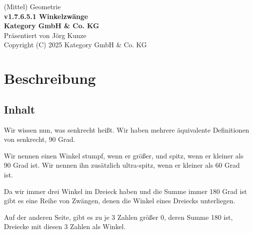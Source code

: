 \documentclass[a4paper]{amsart}
\theoremstyle{definition}
\begin{document}
\begin{titlepage}
\centering
{\huge
(Mittel) Geometrie\\[1cm]
\textbf{v1.7.6.5.1 Winkelzwänge}
}\\[1cm]

\textbf{Kategory GmbH \& Co. KG}\\
Präsentiert von Jörg Kunze\\
Copyright (C) 2025 Kategory GmbH \& Co. KG

\end{titlepage}

%

\newpage

\section*{Beschreibung}

\subsection*{Inhalt}
Wir wissen nun, was senkrecht heißt. Wir haben mehrere äquivalente Definitionen von senkrecht, 90 Grad.

Wir nennen einen Winkel stumpf, wenn er größer, und spitz, wenn er kleiner als 90 Grad ist. Wir nennen ihn zusätzlich ultra-spitz, wenn er kleiner als 60 Grad ist.

Da wir immer drei Winkel im Dreieck haben und die Summe immer 180 Grad ist gibt es eine Reihe von Zwängen, denen die Winkel eines Dreiecks unterliegen.

Auf der anderen Seite, gibt es zu je 3 Zahlen größer 0, deren Summe 180 ist, Dreiecke mit diesen 3 Zahlen als Winkel.
\end{document}
